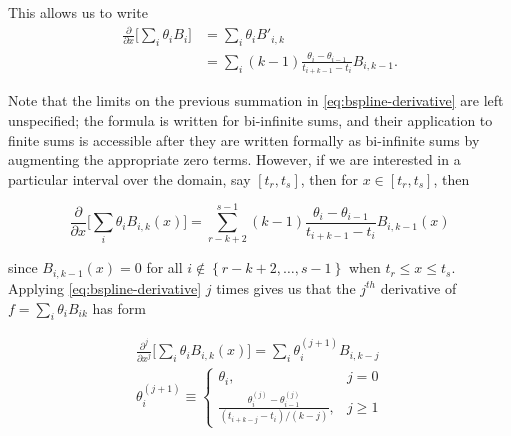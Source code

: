 \noindent
This allows us to write 
\begin{align} 
\frac{\partial}{\partial x} \bigg[ \sum_{i} \theta_i B_i \bigg] &=  \sum_i \theta_i B'_{i,k}\nonumber \\
&= \sum_i \left(k-1\right) \frac{\theta_i - \theta_{i-1}}{t_{i+k-1}-t_i}B_{i,k-1}. \label{eq:bspline-derivative}
\end{align}  

Note that the limits on the previous summation in \ref{eq:bspline-derivative} are left unspecified; the formula is written for bi-infinite sums, and their application to finite sums is accessible after they are written formally as bi-infinite sums by augmenting the appropriate zero terms. However, if we are interested in a particular interval over the domain, say $\left[t_r,t_s\right]$, then for $x \in \left[t_r,t_s\right]$, then


\[
\frac{\partial}{\partial x} \bigg[ \sum_i \theta_i B_{i,k}\left(x\right) \bigg]  = \sum_{r-k+2}^{s-1}\left(k-1\right) \frac{\theta_i-\theta_{i-1}}{t_{i+k-1} - t_i}B_{i,k-1}\left(x\right)
\]

\noindent
since $B_{i,k-1}\left(x\right)=0$ for all $i \not \in \left\{r-k+2,\dots, s-1 \right\}$ when $t_r \le x\le t_s$. Applying \ref{eq:bspline-derivative} $j$ times gives us that the $j^{th}$ derivative of $f = \sum_{i} \theta_i B_{ik}$ has form


\begin{align}
\frac{\partial^j}{\partial x^j} \bigg[ \sum_i \theta_i B_{i,k}\left(x\right) \bigg] =  \sum_i \theta_i^{\left(j+1\right)} B_{i,k-j} \label{eq:BS_jth_deriv_a} \\
\theta_i^{\left(j+1\right)} \equiv \left\{ \begin{array}{cl} \theta_i, & j = 0 \\
						\frac{\theta_i^{\left(j\right)} - \theta_{i-1}^{\left(j\right)} }{\left( t_{i+k-j}-t_{i}\right)/\left(k-j\right)}, & j \ge 1 
  \end{array} \right.\label{eq:BS_jth_deriv_b}
\end{align}

